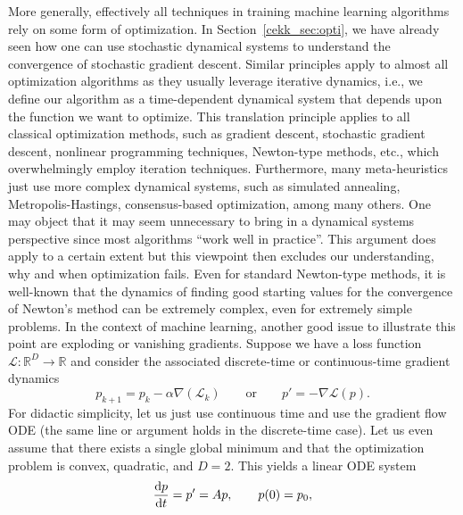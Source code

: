 \documentclass[10pt]{article}
\newcommand{\R}{{\mathbb R}}
\def\R{\mathbb{R}}
\def\cL{\mathcal{L}}
\def\txtd{{\textnormal{d}}}
\def\ra{\rightarrow}
\newcommand{\be}{\begin{equation}}
\newcommand{\ee}{\end{equation}}
\newcommand{\benn}{\begin{equation*}}
\newcommand{\eenn}{\end{equation*}}
\begin{document}
More generally, effectively all techniques in training machine learning algorithms rely on some form of optimization. In Section~\ref{cekk_sec:opti}, we have already seen how one can use stochastic dynamical systems to understand the convergence of stochastic gradient descent. Similar principles apply to almost all optimization algorithms as they usually leverage iterative dynamics, i.e., we define our algorithm as a time-dependent dynamical system that depends upon the function we want to optimize. This translation principle applies to all classical optimization methods, such as gradient descent, stochastic gradient descent, nonlinear programming techniques, Newton-type methods, etc., which overwhelmingly employ iteration techniques. Furthermore, many meta-heuristics just use more complex dynamical systems, such as simulated annealing, Metropolis-Hastings, consensus-based optimization, among many others. One may object that it may seem unnecessary to bring in a dynamical systems perspective since most algorithms ``work well in practice''. This argument does apply to a certain extent but this viewpoint then excludes our understanding, why and when optimization fails. Even for standard Newton-type methods, it is well-known that the dynamics of finding good starting values for the convergence of Newton's method can be extremely complex, even for extremely simple problems. In the context of machine learning, another good issue to illustrate this point are exploding or vanishing gradients. Suppose we have a loss function $\cL:\R^D\ra \R$ and consider the associated discrete-time or continuous-time gradient dynamics
\benn
p_{k+1} = p_k-\alpha\nabla (\cL_k)\qquad \text{or}\qquad p'=-\nabla \cL(p).
\eenn      
For didactic simplicity, let us just use continuous time and use the gradient flow ODE (the same line or argument holds in the discrete-time case). Let us even assume that there exists a single global minimum and that the optimization problem is convex, quadratic, and $D=2$. This yields a linear ODE system
\be
\label{cekk_eq:ODE2Dtrivial}
\frac{\txtd p}{\txtd t}=p'=Ap,\qquad p(0)=p_0,
\ee
\end{document}
